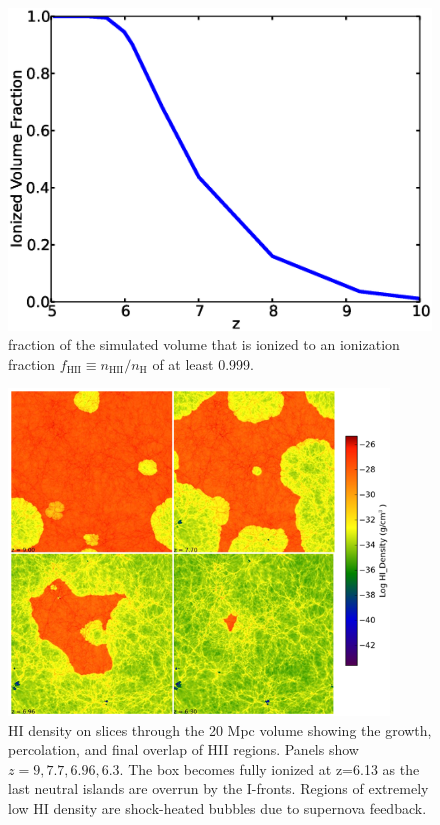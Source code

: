 \documentclass[letterpaper,10pt]{article}
\renewcommand{\(}{\left(}
\renewcommand{\)}{\right)}
\begin{document}
\begin{figure}
  \includegraphics[scale=0.45]{E3Ionized_vs_Redshift.eps}
  \caption{\footnotesize fraction of the simulated volume that is ionized to an ionization
fraction $f_\mathrm{HII} \equiv n_\mathrm{HII}/n_\mathrm{H}$ of at least 0.999.}
  \label{fig:vi_vs_z}
\end{figure}

\begin{figure}[ht]
  \includegraphics[width=0.9\textwidth]{4_panel_HI_slice.png}
  \caption{\footnotesize HI density on slices through the 20 Mpc volume showing the growth, 
percolation, and final overlap of HII regions. Panels show $z=9, 7.7,
6.96, 6.3$. The box becomes fully ionized at z=6.13 as the last neutral islands
are overrun by the I-fronts. Regions of extremely low HI density are shock-heated 
bubbles due to supernova feedback.}
  \label{fig:HI_slices}
\end{figure}
\end{document}

